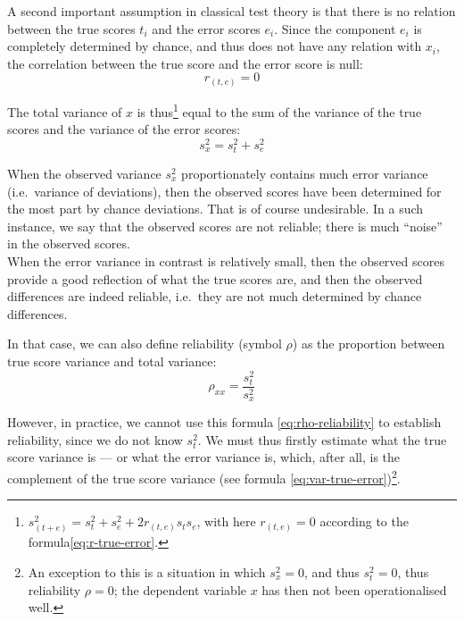 \documentclass[
]{book}
\begin{document}
A second important assumption in classical test theory is that there
is no relation between the true scores \(t_i\) and the error scores \(e_i\).
Since the component \(e_i\) is completely determined by chance, and thus does not
have any relation with \(x_i\), the correlation between the true score and
the error score is null:
\begin{equation}
  \label{eq:r-true-error}
  r_{(t,e)} = 0
\end{equation}

The total variance of \(x\) is thus\footnote{\(s^2_{(t+e)} = s^2_t + s^2_e + 2 r_{(t,e)} s_t s_e\), with here \(r_{(t,e)}=0\) according to the formula\eqref{eq:r-true-error}.} equal to the sum of the variance
of the true scores and the variance of the error scores:
\begin{equation}
  \label{eq:var-true-error}
  s^2_x = s^2_t + s^2_e
\end{equation}

When the observed variance \(s^2_x\) proportionately contains much
error variance (i.e.~variance of deviations), then the observed scores
have been determined for the most part by chance deviations. That is of course
undesirable. In a such instance, we say that the observed scores
are not reliable; there is much ``noise'' in the observed scores.\\
When the error variance in contrast is relatively small, then
the observed scores provide a good reflection of what the true scores are,
and then the observed differences are indeed reliable, i.e.~they
are not much determined by chance differences.

In that case, we can also define reliability (symbol \(\rho\)) as the
proportion between true score variance and total variance:\\
\begin{equation}
  \label{eq:rho-reliability}
  \rho_{xx} = \frac{s^2_t}{s^2_x}
\end{equation}

However, in practice, we cannot use this formula \eqref{eq:rho-reliability} to
establish reliability, since we do not know \(s^2_t\). We must thus firstly
estimate what the true score variance is --- or what the error variance is, which, after all,
is the complement of the true score variance (see
formula \eqref{eq:var-true-error})\footnote{An exception to this is a situation in which \(s^2_x=0\), and thus \(s^2_t=0\), thus reliability \(\rho=0\); the dependent variable \(x\) has then not been
  operationalised well.}.
\end{document}
